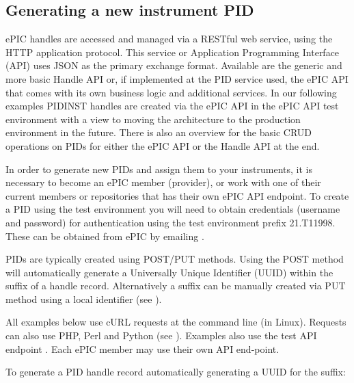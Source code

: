 \documentclass[a4paper,10pt,english]{sphinxmanual}
\begin{document}
\subsection{Generating a new instrument PID}
\label{\detokenize{cookbook/handles:generating-a-new-instrument-pid}}
ePIC handles are accessed and managed via a RESTful web service, using
the HTTP application protocol.  This service or Application
Programming Interface (API) uses JSON as the primary exchange format.
Available are the generic and more basic Handle API or, if implemented
at the PID service used, the ePIC API that comes with its own business
logic and additional services.  In our following examples PIDINST
handles are created via the ePIC API in the ePIC API test environment
with a view to moving the architecture to the production environment
in the future.  There is also an overview for the basic CRUD
operations on PIDs for either the ePIC API or the Handle API at the
end.

In order to generate new PIDs and assign them to your instruments, it
is necessary to become an ePIC member (provider), or work with one of
their current members or repositories that has their own ePIC API
endpoint.  To create a PID using the test environment you will need to
obtain credentials (username and password) for authentication using
the test environment prefix 21.T11998.  These can be obtained from
ePIC by emailing .

PIDs are typically created using POST/PUT methods.  Using the POST
method will automatically generate a Universally Unique Identifier
(UUID) within the suffix of a handle record.  Alternatively a suffix
can be manually created via PUT method using a local identifier (see
).

All examples below use cURL requests at the command line (in Linux).
Requests can also use PHP, Perl and Python (see
).  Examples also use
the test API endpoint .  Each
ePIC member may use their own API end-point.

To generate a PID handle record automatically generating a UUID for
the suffix:
\end{document}
